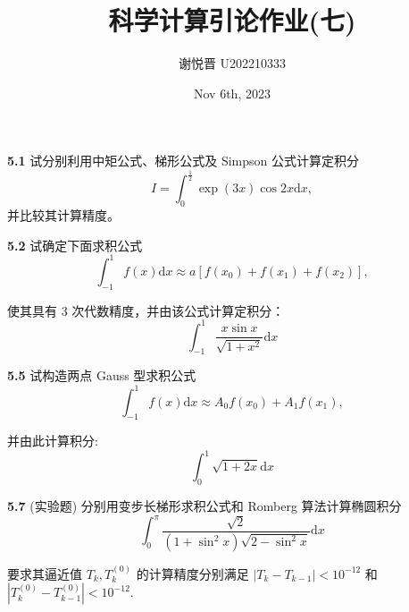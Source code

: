 \documentclass[a4paper,11pt,UTF8]{article}
\title{科学计算引论作业(七)}
\author{谢悦晋 \quad U202210333}
\date{Nov 6th, 2023 }
\begin{document}
\maketitle
\textbf{5.1} 试分别利用中矩公式、梯形公式及 Simpson 公式计算定积分
$$
I=\int_0^{\frac12}\exp(3x)\cos2x\mathrm{d}x,
$$
并比较其计算精度。

\textbf{5.2} 试确定下面求积公式
$$
\int_{-1}^1f(x)\mathrm{d}x\approx a[f(x_0)+f(x_1)+f(x_2)],
$$

使其具有 3 次代数精度，并由该公式计算定积分：
$$
	\int_{-1}^1\frac{x\sin x}{\sqrt{1+x^2}}\mathrm{d}x
$$

\textbf{5.5} 试构造两点 Gauss 型求积公式
$$
	\int_{-1}^1f(x)\mathrm{d}x\approx A_0f(x_0)+A_1f(x_1),
$$

并由此计算积分:
$$
	\int_0^1\sqrt{1+2x}\mathrm{d}x
$$

\textbf{5.7} (实验题) 分别用变步长梯形求积公式和 Romberg 算法计算椭圆积分
$$
	\int_0^\pi\frac{\sqrt{2}}{(1+\sin^2x)\sqrt{2-\sin^2x}}\mathrm{d}x
$$

要求其逼近值 $T_k,T_k^{(0)}$ 的计算精度分别满足 $|T_k-T_{k-1}|<10^{-12}$ 和$|T_k^{(0)}-T_{k-1}^{(0)}|<10^{-12}$.
\end{document}
